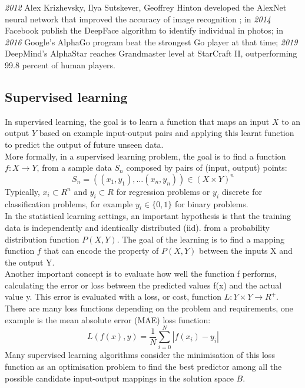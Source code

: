\emph{2012} Alex Krizhevsky, Ilya Sutskever, Geoffrey Hinton developed the AlexNet neural network that improved the accuracy of image recognition \cite{alexnet}; in \emph{2014} Facebook publish the DeepFace algorithm to identify individual in photos; in \emph{2016} Google's AlphaGo program beat the strongest Go player at that time; \emph{2019} DeepMind's AlphaStar reaches Grandmaster level at StarCraft II, outperforming 99.8 percent of human players.

\subsection{Supervised learning}
In supervised learning, the goal is to learn a function that maps an input $X$ to an output $Y$ based on example input-output pairs and applying this learnt function to predict the output of future unseen data. \\

More formally, in a supervised learning problem, the goal is to find a function $f : X \rightarrow Y$, from a sample data $S_n$ composed by pairs of (input, output) points:
\[
S_n = ((x_1,y_1),\dots(x_n,y_n)) \in (X \times Y)^n
\]
Typically, $x_i \subset R^n$ and $y_i \subset R$ for regression problems or $y_i$ discrete for classification problems, for example $y_i \in \{0,1\}$ for binary problems. \\

In the statistical learning settings, an important hypothesis is that the training data is independently and identically distributed (\gls{iid}). from a probability distribution function $P(X,Y)$. The goal of the learning is to find a mapping function $f$ that can encode the property of $P(X,Y)$ between the inputs X and the output Y. \\

Another important concept is to evaluate how well the function f performs, calculating the error or loss between the predicted values f(x) and the actual value y. This error is evaluated with a loss, or cost, function $L: Y \times Y \rightarrow R^+$. There are many loss functions depending on the problem and requirements, one example is the mean absolute error (\gls{MAE}) loss function:
\[
L(f(x),y)= \frac{1}{N} \sum_{i=0}^{N} |f(x_i)-y_i| 
\]
Many supervised learning algorithms consider the minimisation
of this loss function as an optimisation problem to find the best predictor among all the possible candidate input-output mappings in the solution space $B$. \\

